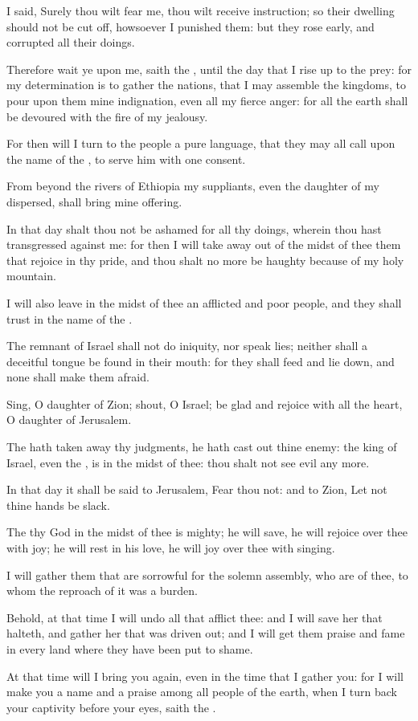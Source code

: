 \Verse I said, Surely thou wilt fear me, thou wilt receive instruction; so their dwelling should not be cut off, howsoever I punished them: but they rose early, and corrupted all their doings.

\Verse Therefore wait ye upon me, saith the \LORD, until the day that I rise up to the prey: for my determination is to gather the nations, that I may assemble the kingdoms, to pour upon them mine indignation, even all my fierce anger: for all the earth shall be devoured with the fire of my jealousy.

\Verse For then will I turn to the people a pure language, that they may all call upon the name of the \LORD, to serve him with one consent.

\Verse From beyond the rivers of Ethiopia my suppliants, even the daughter of my dispersed, shall bring mine offering.

\Verse In that day shalt thou not be ashamed for all thy doings, wherein thou hast transgressed against me: for then I will take away out of the midst of thee them that rejoice in thy pride, and thou shalt no more be haughty because of my holy mountain.

\Verse I will also leave in the midst of thee an afflicted and poor people, and they shall trust in the name of the \LORD.

\Verse The remnant of Israel shall not do iniquity, nor speak lies; neither shall a deceitful tongue be found in their mouth: for they shall feed and lie down, and none shall make them afraid.

\Verse Sing, O daughter of Zion; shout, O Israel; be glad and rejoice with all the heart, O daughter of Jerusalem.

\Verse The \LORD hath taken away thy judgments, he hath cast out thine enemy: the king of Israel, even the \LORD, is in the midst of thee: thou shalt not see evil any more.

\Verse In that day it shall be said to Jerusalem, Fear thou not: and to Zion, Let not thine hands be slack.

\Verse The \LORD thy God in the midst of thee is mighty; he will save, he will rejoice over thee with joy; he will rest in his love, he will joy over thee with singing.

\Verse I will gather them that are sorrowful for the solemn assembly, who are of thee, to whom the reproach of it was a burden.

\Verse Behold, at that time I will undo all that afflict thee: and I will save her that halteth, and gather her that was driven out; and I will get them praise and fame in every land where they have been put to shame.

\Verse At that time will I bring you again, even in the time that I gather you: for I will make you a name and a praise among all people of the earth, when I turn back your captivity before your eyes, saith the \LORD.

